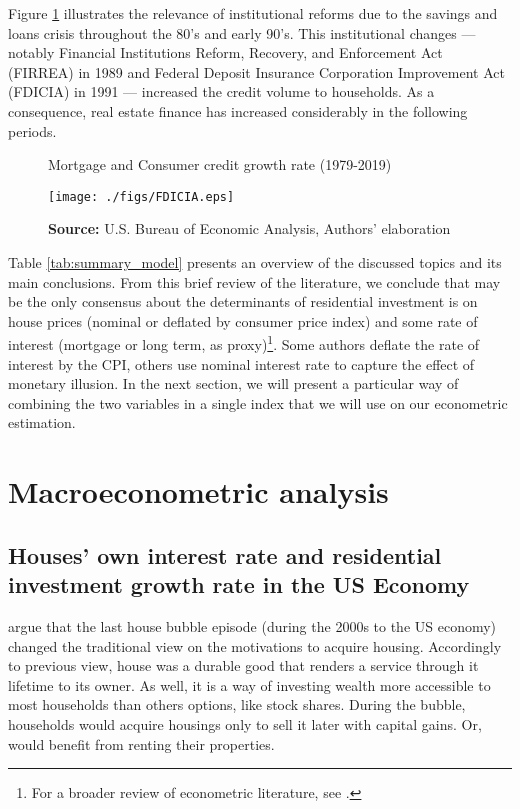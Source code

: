 \documentclass[12pt, a4paper]{article}
\begin{document}
Figure \ref{Fig:CreditFDICIA} illustrates the relevance of institutional reforms due to the savings and loans crisis throughout the 80's and early 90's.
This institutional changes --- notably Financial Institutions Reform, Recovery, and Enforcement Act (FIRREA) in 1989 and Federal Deposit Insurance Corporation Improvement Act  (FDICIA) in 1991 --- increased the credit volume to households.
As a consequence, real estate finance has increased considerably in the following periods.


\begin{figure}[htb]
	\centering
	\caption{Mortgage and Consumer credit growth rate (1979-2019)}
	\label{Fig:CreditFDICIA}
	\texttt{[image: ./figs/FDICIA.eps]}
	\caption*{\textbf{Source:} U.S. Bureau of Economic Analysis, Authors' elaboration}
\end{figure}

Table \ref{tab:summary_model} presents an overview of the discussed topics and its main conclusions.
From this brief review of the literature, we conclude that may be the only consensus about the determinants of residential investment is on house prices (nominal or deflated by consumer price index) and some rate of interest (mortgage or long term, as proxy)\footnote{For a broader review of econometric literature, see \textcite{egebo_1990_MODEL}.}.
Some authors deflate the rate of interest by the CPI, others use nominal interest rate to capture the effect of monetary illusion.
In the next section, we will present a particular way of combining the two variables in a single index that we will use on our econometric estimation.




\section{Macroeconometric analysis}
\label{sec:orgdb43262}
\label{sec:VECM}
\subsection{Houses' own interest rate and residential investment growth rate in the US	Economy}
\label{sec:orgaafc2a0}
\label{sc:own}


\textcite{arestis_residential_2015} argue that the last house bubble episode (during the 2000s to the US economy) changed the traditional view on the motivations to acquire housing.
Accordingly to previous view, house was a durable good that renders a service through it lifetime to its owner.
As well, it is a way of investing wealth more accessible to most households than others options, like stock shares.
During the bubble, households would acquire housings only to sell it later with capital gains.
Or, would benefit from renting their properties.
\end{document}
